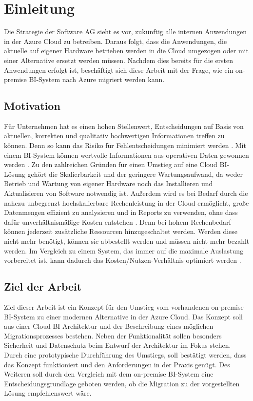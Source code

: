 \chapter{Einleitung} \label{ch:intro}
Die Strategie der Software AG sieht es vor, zukünftig alle internen Anwendungen in der Azure Cloud zu betreiben. Daraus folgt, dass die Anwendungen, die aktuelle auf eigener Hardware betrieben werden in die Cloud umgezogen oder mit einer Alternative ersetzt werden müssen. Nachdem dies bereits für die ersten Anwendungen erfolgt ist, beschäftigt sich diese Arbeit mit der Frage, wie ein on-premise BI-System nach Azure migriert werden kann.

\section{Motivation} \label{sec:intro:motivation}
Für Unternehmen hat es einen hohen Stellenwert, Entscheidungen auf Basis von aktuellen, korrekten und qualitativ hochwertigen Informationen treffen zu können. Denn so kann das Risiko für Fehlentscheidungen minimiert werden \cite{grunwald_business_2009}. Mit einem BI-System können wertvolle Informationen aus operativen Daten gewonnen werden \cite{muller_business_2013}. Zu den zahlreichen Gründen für einen Umstieg auf eine Cloud BI-Lösung gehört die Skalierbarkeit und der geringere Wartungsaufwand, da weder Betrieb und Wartung von eigener Hardware noch das Installieren und Aktualisieren von Software notwendig ist. Außerdem wird es bei Bedarf durch die nahezu unbegrenzt hochskalierbare Rechenleistung in der Cloud ermöglicht, große Datenmengen effizient zu analysieren und in Reports zu verwenden, ohne dass dafür unverhältnismäßige Kosten entstehen \cite{gurjar_cloud_2013}. Denn bei hohem Rechenbedarf können jederzeit zusätzliche Ressourcen hinzugeschaltet werden. Werden diese nicht mehr benötigt, können sie abbestellt werden und müssen nicht mehr bezahlt werden. Im Vergleich zu einem System, das immer auf die maximale Auslastung vorbereitet ist, kann dadurch das Kosten/Nutzen-Verhältnis optimiert werden \cite{ouf_cloud_2011}.

\section{Ziel der Arbeit} \label{sec:intro:ziele}
Ziel dieser Arbeit ist ein Konzept für den Umstieg vom vorhandenen on-premise BI-System zu einer modernen Alternative in der Azure Cloud. Das Konzept soll aus einer Cloud BI-Architektur und der Beschreibung eines möglichen Migrationsprozesses bestehen. Neben der Funktionalität sollen besonders Sicherheit und Datenschutz beim Entwurf der Architektur im Fokus stehen. Durch eine prototypische Durchführung des Umstiegs, soll bestätigt werden, dass das Konzept funktioniert und den Anforderungen in der Praxis genügt. Des Weiteren soll durch den Vergleich mit dem on-premise BI-System eine Entscheidungsgrundlage geboten werden, ob die Migration zu der vorgestellten Lösung empfehlenswert wäre.

